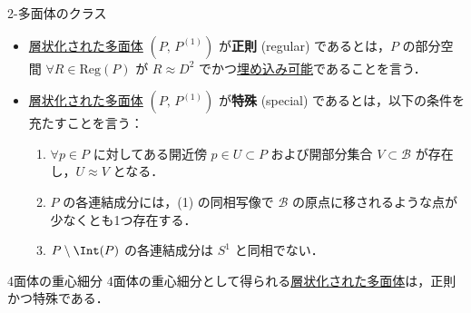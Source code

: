 \documentclass[TQFT_main]{subfiles}
\begin{document}
\begin{mydef}[label=def:polyhedra-special]{2-多面体のクラス}
    \begin{itemize}
        \item \hyperref[def:polyhedron]{層状化された多面体} $(P,\, P^{(1)})$ が\textbf{正則} (regular) であるとは，$P$ の部分空間 $\forall R \in \mathrm{Reg}(P)$ が $R \approx D^2$ でかつ\hyperref[def:polyhedron]{埋め込み可能}であることを言う．
        \item \hyperref[def:polyhedron]{層状化された多面体} $(P,\, P^{(1)})$ が\textbf{特殊} (special) であるとは，以下の条件を充たすことを言う：
        \begin{enumerate}
            \item $\forall p \in P$ に対してある開近傍 $p \in U \subset P$ および開部分集合 $V \subset \mathcal{B}$ が存在し，$U \approx V$ となる．
            \item $P$ の各連結成分には，(1) の同相写像で $\mathcal{B}$ の原点に移されるような点が少なくとも1つ存在する．
            \item $P \setminus \Int(P)$ の各連結成分は $S^1$ と同相でない．
        \end{enumerate}
        
    \end{itemize}
    
\end{mydef}

\begin{myexample}[label=ex:tetrahedron]{4面体の重心細分}
    4面体の重心細分として得られる\hyperref[def:polyhedra-special]{層状化された多面体}は，正則かつ特殊である．
\end{myexample}
\end{document}
